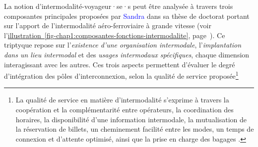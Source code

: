 \begin{refsegment}
La notion d’intermodalité-voyageur·se·s peut être analysée à travers trois composantes principales proposées par \textcolor{blue}{Sandra} \textcolor{blue}{\textcite[167]{bozzani_grandes_2006}} dans sa thèse de doctorat portant sur l’apport de l’intermodalité aéro-ferroviaire à grande vitesse (voir l'\hyperref[fig-chap1:composantes-fonctions-intermodalite]{illustration~\ref{fig-chap1:composantes-fonctions-intermodalite}}, page~\pageref{fig-chap1:composantes-fonctions-intermodalite}). Ce triptyque repose sur l’\textsl{existence d’une organisation intermodale}, l’\textsl{implantation dans un lieu intermodal} et des \textsl{usages intermodaux spécifiques}, chaque dimension interagissant avec les autres. Ces trois aspects permettent d’évaluer le degré d’intégration des pôles d’interconnexion, selon la qualité de service proposée\footnote{
    La qualité de service en matière d’intermodalité s’exprime à travers la coopération et la complémentarité entre opérateurs, la coordination des horaires, la disponibilité d’une information intermodale, la mutualisation de la réservation de billets, un cheminement facilité entre les modes, un temps de connexion et d’attente optimisé, ainsi que la prise en charge des bagages \textcolor{blue}{\autocites[65]{bozzani_intermodalite_2005}[167]{bozzani_grandes_2006}}.
}
\end{refsegment}

